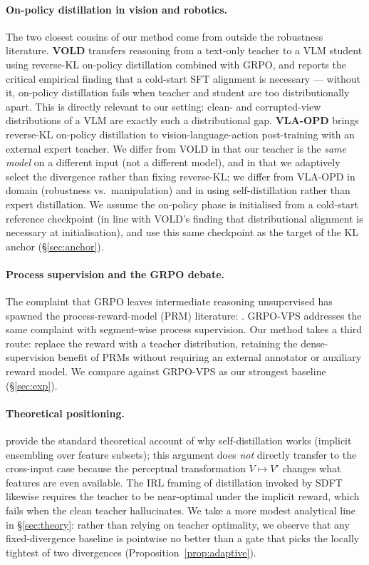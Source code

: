 \documentclass{article}
\begin{document}
\paragraph{On-policy distillation in vision and robotics.}
The two closest cousins of our method come from outside the robustness literature. \textbf{VOLD} \citep{bousselham2025vold} transfers reasoning from a text-only teacher to a VLM student using reverse-KL on-policy distillation combined with GRPO, and reports the critical empirical finding that a cold-start SFT alignment is necessary --- without it, on-policy distillation fails when teacher and student are too distributionally apart. This is directly relevant to our setting: clean- and corrupted-view distributions of a VLM are exactly such a distributional gap. \textbf{VLA-OPD} \citep{zhong2025vlaopd} brings reverse-KL on-policy distillation to vision-language-action post-training with an external expert teacher. We differ from VOLD in that our teacher is the \emph{same model} on a different input (not a different model), and in that we adaptively select the divergence rather than fixing reverse-KL; we differ from VLA-OPD in domain (robustness vs.\ manipulation) and in using self-distillation rather than expert distillation. We assume the on-policy phase is initialised from a cold-start reference checkpoint (in line with VOLD's finding that distributional alignment is necessary at initialisation), and use this same checkpoint as the target of the KL anchor (\S\ref{sec:anchor}).

\paragraph{Process supervision and the GRPO debate.}
The complaint that GRPO leaves intermediate reasoning unsupervised has spawned the process-reward-model (PRM) literature: \citet{lightman2024lets,wang2024mathshepherd,luo2024omegaprm}. GRPO-VPS \citep{grpovps2025} addresses the same complaint with segment-wise process supervision. Our method takes a third route: replace the reward with a teacher distribution, retaining the dense-supervision benefit of PRMs without requiring an external annotator or auxiliary reward model. We compare against GRPO-VPS as our strongest baseline (\S\ref{sec:exp}).

\paragraph{Theoretical positioning.}
\citet{allenzhu2023towards} provide the standard theoretical account of why self-distillation works (implicit ensembling over feature subsets); this argument does \emph{not} directly transfer to the cross-input case because the perceptual transformation $V \mapsto V'$ changes what features are even available. The IRL framing of distillation invoked by SDFT \citep{shenfeld2026sdft,ziebart2008maximum} likewise requires the teacher to be near-optimal under the implicit reward, which fails when the clean teacher hallucinates. We take a more modest analytical line in \S\ref{sec:theory}: rather than relying on teacher optimality, we observe that any fixed-divergence baseline is pointwise no better than a gate that picks the locally tightest of two divergences (Proposition~\ref{prop:adaptive}).
\end{document}
